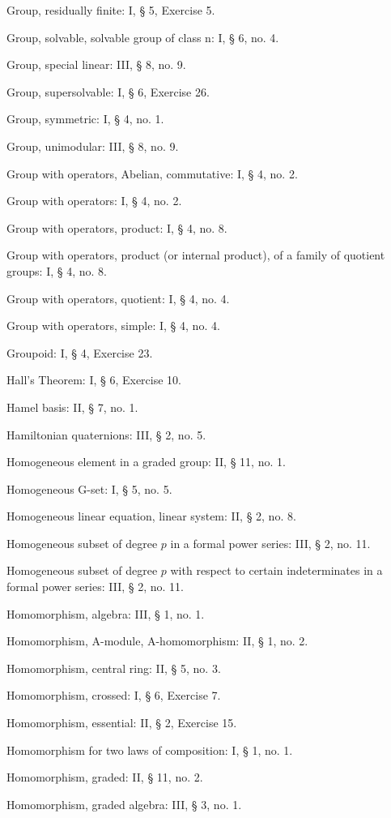 Group, residually finite: I, § 5, Exercise 5.

Group, solvable, solvable group of class n: I, § 6, no. 4.

Group, special linear: III, § 8, no. 9.

Group, supersolvable: I, § 6, Exercise 26.

Group, symmetric: I, § 4, no. 1.

Group, unimodular: III, § 8, no. 9.

Group with operators, Abelian, commutative: I, § 4, no. 2.

Group with operators: I, § 4, no. 2.

Group with operators, product: I, § 4, no. 8.

Group with operators, product (or internal product), of a family of quotient groups: I, § 4, no. 8.

Group with operators, quotient: I, § 4, no. 4.

Group with operators, simple: I, § 4, no. 4.

Groupoid: I, § 4, Exercise 23.

Hall's Theorem: I, § 6, Exercise 10.

Hamel basis: II, § 7, no. 1.

Hamiltonian quaternions: III, § 2, no. 5.

Homogeneous element in a graded group: II, § 11, no. 1.

Homogeneous G-set: I, § 5, no. 5.

Homogeneous linear equation, linear system: II, § 2, no. 8.

Homogeneous subset of degree \(p\) in a formal power series: III, § 2, no. 11.

Homogeneous subset of degree \(p\) with respect to certain indeterminates in a formal power series: III, § 2, no. 11.

Homomorphism, algebra: III, § 1, no. 1.

Homomorphism, A-module, A-homomorphism: II, § 1, no. 2.

Homomorphism, central ring: II, § 5, no. 3.

Homomorphism, crossed: I, § 6, Exercise 7.

Homomorphism, essential: II, § 2, Exercise 15.

Homomorphism for two laws of composition: I, § 1, no. 1.

Homomorphism, graded: II, § 11, no. 2.

Homomorphism, graded algebra: III, § 3, no. 1.

